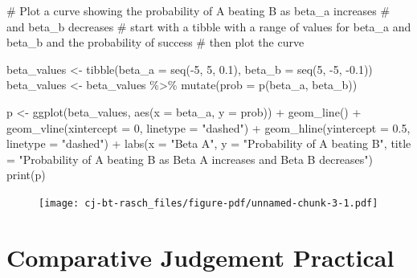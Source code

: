 \documentclass[
  letterpaper,
  DIV=11,
  numbers=noendperiod]{scrreprt}
\newenvironment{Shaded}{\begin{snugshade}}{\end{snugshade}}
\newcommand{\AttributeTok}[1]{\textcolor[rgb]{0.40,0.45,0.13}{#1}}
\newcommand{\CommentTok}[1]{\textcolor[rgb]{0.37,0.37,0.37}{#1}}
\newcommand{\DecValTok}[1]{\textcolor[rgb]{0.68,0.00,0.00}{#1}}
\newcommand{\FloatTok}[1]{\textcolor[rgb]{0.68,0.00,0.00}{#1}}
\newcommand{\FunctionTok}[1]{\textcolor[rgb]{0.28,0.35,0.67}{#1}}
\newcommand{\NormalTok}[1]{\textcolor[rgb]{0.00,0.23,0.31}{#1}}
\newcommand{\OtherTok}[1]{\textcolor[rgb]{0.00,0.23,0.31}{#1}}
\newcommand{\SpecialCharTok}[1]{\textcolor[rgb]{0.37,0.37,0.37}{#1}}
\newcommand{\StringTok}[1]{\textcolor[rgb]{0.13,0.47,0.30}{#1}}
\begin{document}
\begin{Shaded}
\begin{Highlighting}[]
\CommentTok{\# Plot a curve showing the probability of A beating B as beta\_a increases}
\CommentTok{\# and beta\_b decreases}
\CommentTok{\# start with a tibble with a range of values for beta\_a and beta\_b and the probability of success}
\CommentTok{\# then plot the curve}

\NormalTok{beta\_values }\OtherTok{\textless{}{-}} \FunctionTok{tibble}\NormalTok{(}\AttributeTok{beta\_a =} \FunctionTok{seq}\NormalTok{(}\SpecialCharTok{{-}}\DecValTok{5}\NormalTok{, }\DecValTok{5}\NormalTok{, }\FloatTok{0.1}\NormalTok{), }\AttributeTok{beta\_b =} \FunctionTok{seq}\NormalTok{(}\DecValTok{5}\NormalTok{, }\SpecialCharTok{{-}}\DecValTok{5}\NormalTok{, }\SpecialCharTok{{-}}\FloatTok{0.1}\NormalTok{))}
\NormalTok{beta\_values }\OtherTok{\textless{}{-}}\NormalTok{ beta\_values }\SpecialCharTok{\%\textgreater{}\%} \FunctionTok{mutate}\NormalTok{(}\AttributeTok{prob =} \FunctionTok{p}\NormalTok{(beta\_a, beta\_b))}

\NormalTok{p }\OtherTok{\textless{}{-}} \FunctionTok{ggplot}\NormalTok{(beta\_values, }\FunctionTok{aes}\NormalTok{(}\AttributeTok{x =}\NormalTok{ beta\_a, }\AttributeTok{y =}\NormalTok{ prob)) }\SpecialCharTok{+}
  \FunctionTok{geom\_line}\NormalTok{() }\SpecialCharTok{+}
  \FunctionTok{geom\_vline}\NormalTok{(}\AttributeTok{xintercept =} \DecValTok{0}\NormalTok{, }\AttributeTok{linetype =} \StringTok{"dashed"}\NormalTok{) }\SpecialCharTok{+}
  \FunctionTok{geom\_hline}\NormalTok{(}\AttributeTok{yintercept =} \FloatTok{0.5}\NormalTok{, }\AttributeTok{linetype =} \StringTok{"dashed"}\NormalTok{) }\SpecialCharTok{+}
  \FunctionTok{labs}\NormalTok{(}\AttributeTok{x =} \StringTok{"Beta A"}\NormalTok{, }\AttributeTok{y =} \StringTok{"Probability of A beating B"}\NormalTok{, }\AttributeTok{title =} \StringTok{"Probability of A beating B as Beta A increases and Beta B decreases"}\NormalTok{)}
\FunctionTok{print}\NormalTok{(p)}
\end{Highlighting}
\end{Shaded}

\begin{figure}[H]

{\centering \texttt{[image: cj-bt-rasch\_files/figure-pdf/unnamed-chunk-3-1.pdf]}

}

\end{figure}

\hypertarget{comparative-judgement-practical}{%
\chapter{Comparative Judgement
Practical}\label{comparative-judgement-practical}}
\end{document}
